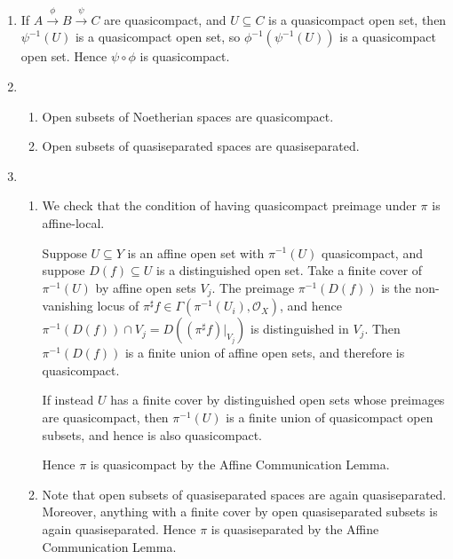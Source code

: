 \documentclass{report}
\renewcommand{\O}{\mathscr{O}} %
\begin{document}
\begin{enumerate}[label=\textbf{7.3.\Alph*.}]
	\item If $A\xrightarrow\phi B\xrightarrow\psi C$ are quasicompact, and
	      $U\subseteq C$ is a quasicompact open set, then $\psi^{-1}(U)$ is a
	      quasicompact open set, so $\phi^{-1}(\psi^{-1}(U))$ is a quasicompact
	      open set. Hence $\psi\circ\phi$ is quasicompact.

	\item
	      \begin{enumerate}[label=(\alph*)]
		      \item Open subsets of Noetherian spaces are quasicompact.
		      \item Open subsets of quasiseparated spaces are quasiseparated.
	      \end{enumerate}

	\item
	      \begin{enumerate}[label=(\alph*)]
		      \item We check that the condition of having quasicompact preimage
		            under $\pi$ is affine-local.

		            Suppose $U\subseteq Y$ is an affine open set with $\pi^{-1}(U)$
		            quasicompact, and suppose $D(f)\subseteq U$ is a distinguished
		            open set. Take a finite cover of $\pi^{-1}(U)$ by affine open
		            sets $V_j$. The preimage $\pi^{-1}(D(f))$ is the non-vanishing
		            locus of $\pi^\sharp f\in\Gamma(\pi^{-1}(U_i),\O_X)$, and hence
		            $\pi^{-1}(D(f))\cap V_j=D((\pi^\sharp f)|_{V_j})$ is
		            distinguished in $V_j$. Then $\pi^{-1}(D(f))$ is a finite union
		            of affine open sets, and therefore is quasicompact.

		            If instead $U$ has a finite cover by distinguished open sets
		            whose preimages are quasicompact, then $\pi^{-1}(U)$ is a finite
		            union of quasicompact open subsets, and hence is also
		            quasicompact.

		            Hence $\pi$ is quasicompact by the Affine Communication Lemma.

		      \item Note that open subsets of quasiseparated spaces are again
		            quasiseparated. Moreover, anything with a finite cover by open
		            quasiseparated subsets is again quasiseparated. Hence $\pi$ is
		            quasiseparated by the Affine Communication Lemma.
	      \end{enumerate}


\end{enumerate}
\end{document}
